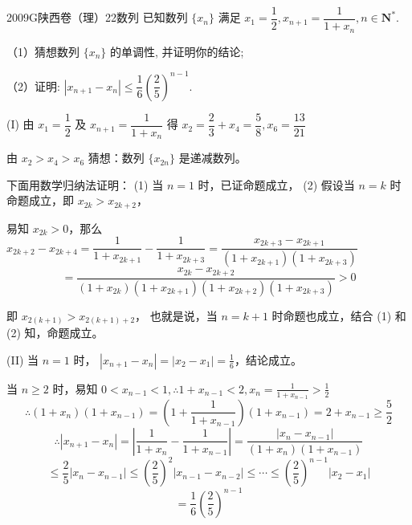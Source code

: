
\begin{problem}{2009}{G}{陕西卷（理）}{22}{数列}
已知数列 $\{x_n\}$ 满足 $x_1=\dfrac{1}{2}, x_{n+1}=\dfrac{1}{1+x_n}, n \in \mathbf{N}^*$.

（1）猜想数列 $\{x_n\}$ 的单调性, 并证明你的结论;

（2）证明: $|x_{n+1}-x_n| \le \dfrac{1}{6}\left(\dfrac{2}{5}\right)^{n-1}$.
\end{problem}

\begin{solutions}[解法一]
(I) 由 $x_1=\dfrac{1}{2}$ 及 $x_{n+1}=\dfrac{1}{1+x_n}$ 得 $x_2=\dfrac{2}{3}+x_4=\dfrac{5}{8}, x_6=\dfrac{13}{21}$

由 $x_2>x_4>x_6$ 猜想：数列 $\{x_{2n}\}$ 是递减数列。

下面用数学归纳法证明：
(1) 当 $n=1$ 时，已证命题成立，
(2) 假设当 $n=k$ 时命题成立，即 $x_{2k}>x_{2k+2}$，

易知 $x_{2k}>0$，那么 $x_{2k+2}-x_{2k+4} = \dfrac{1}{1+x_{2k+1}} - \dfrac{1}{1+x_{2k+3}} = \dfrac{x_{2k+3}-x_{2k+1}}{(1+x_{2k+1})(1+x_{2k+3})}$
$$
= \dfrac{x_{2k}-x_{2k+2}}{(1+x_{2k})(1+x_{2k+1})(1+x_{2k+2})(1+x_{2k+3})} > 0
$$

即 $x_{2(k+1)} > x_{2(k+1)+2}$，
也就是说，当 $n=k+1$ 时命题也成立，结合 (1) 和 (2) 知，命题成立。

(II) 当 $n=1$ 时， $|x_{n+1}-x_n| = |x_2-x_1| = \frac{1}{6}$，结论成立。

当 $n \ge 2$ 时，易知 $0 < x_{n-1} < 1, \therefore 1+x_{n-1} < 2, x_n = \frac{1}{1+x_{n-1}} > \frac{1}{2}$
$$
\therefore (1+x_n)(1+x_{n-1}) = (1+\frac{1}{1+x_{n-1}})(1+x_{n-1}) = 2+x_{n-1} \ge \frac{5}{2}
$$
$$
\therefore |x_{n+1}-x_n| = \left| \frac{1}{1+x_n} - \frac{1}{1+x_{n-1}} \right| = \frac{|x_n-x_{n-1}|}{(1+x_n)(1+x_{n-1})}
$$
$$
\le \frac{2}{5} |x_n-x_{n-1}| \le (\frac{2}{5})^2 |x_{n-1}-x_{n-2}| \le \cdots \le (\frac{2}{5})^{n-1} |x_2-x_1|
$$
$$
= \frac{1}{6} (\frac{2}{5})^{n-1}
$$
\end{solutions}
